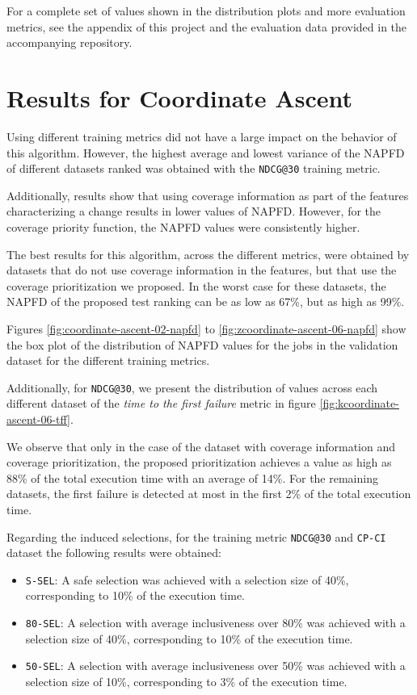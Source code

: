 For a complete set of values shown in the distribution plots and more evaluation metrics, see the appendix of this project
and the evaluation data provided in the accompanying repository.

\section{Results for Coordinate Ascent}

Using different training metrics did not have a large impact on the behavior of this algorithm. 
However, the highest average and lowest variance of the NAPFD of different datasets ranked was obtained with the 
\texttt{NDCG@30} training metric.

Additionally, results show that using coverage information as part of the features characterizing a change
results in lower values of NAPFD. However, for the coverage priority function, the NAPFD values were 
consistently higher.

The best results for this algorithm, across the different metrics, were obtained by datasets that do not
use coverage information in the features, but that use the coverage prioritization we proposed. In the worst case
for these datasets, the NAPFD of the proposed test ranking can be as low as 67\%, but as high as 99\%.

Figures \ref{fig:coordinate-ascent-02-napfd} to \ref{fig:zcoordinate-ascent-06-napfd} show the box plot of the distribution
of NAPFD values for the jobs in the validation dataset for the different training metrics. 

Additionally, for \texttt{NDCG@30}, we present the distribution of values 
across each different dataset of the \emph{time to the first failure} metric in figure \ref{fig:kcoordinate-ascent-06-tff}. 

We observe that only in the case of the dataset with coverage information and coverage prioritization, the proposed prioritization
achieves a value as high as 88\% of the total execution time with an average of 14\%. For the remaining datasets, the first failure is detected
at most in the first 2\% of the total execution time.

Regarding the induced selections, for the training metric \texttt{NDCG@30} and \texttt{CP-CI} dataset the following results were obtained:
\begin{itemize}
    \item \texttt{S-SEL}: A safe selection was achieved with a selection size of 40\%, corresponding to 10\% of the execution time.
    \item \texttt{80-SEL}: A selection with average inclusiveness over 80\% was achieved with a selection size of 40\%, corresponding to 10\% of the execution time.
    \item \texttt{50-SEL}: A selection with average inclusiveness over 50\% was achieved with a selection size of 10\%, corresponding to 3\% of the execution time.
\end{itemize}

